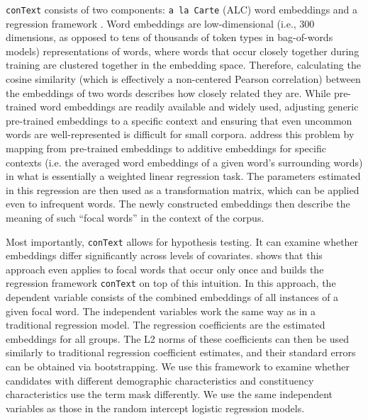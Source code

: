 \texttt{conText} consists of two components: \texttt{a la Carte} (ALC) word embeddings \parencite{khodak2018} and a regression framework \parencite{rodriguez2021embedding}. Word embeddings \parencite{mikolov2013} are low-dimensional (i.e., 300 dimensions, as opposed to tens of thousands of token types in bag-of-words models) representations of words, where words that occur closely together during training are clustered together in the embedding space. Therefore, calculating the cosine similarity (which is effectively a non-centered Pearson correlation) between the embeddings of two words describes how closely related they are. While pre-trained word embeddings are readily available and widely used, adjusting generic pre-trained embeddings to a specific context and ensuring that even uncommon words are well-represented is difficult for small corpora. \cite{khodak2018} address this problem by mapping from pre-trained embeddings to additive embeddings for specific contexts (i.e. the averaged word embeddings of a given word's surrounding words) in what is essentially a weighted linear regression task. The parameters estimated in this regression are then used as a transformation matrix, which can be applied even to infrequent words. The newly constructed embeddings then describe the meaning of such ``focal words'' in the context of the corpus.

Most importantly, \texttt{conText} allows for hypothesis testing. It can examine whether embeddings differ significantly across levels of covariates. \cite{rodriguez2021embedding} shows that this approach even applies to focal words that occur only once and builds the regression framework \texttt{conText} on top of this intuition. In this approach, the dependent variable consists of the combined embeddings of all instances of a given focal word. The independent variables work the same way as in a traditional regression model. The regression coefficients are the estimated embeddings for all groups. The L2 norms of these coefficients can then be used similarly to traditional regression coefficient estimates, and their standard errors can be obtained via bootstrapping. We use this framework to examine whether candidates with different demographic characteristics and constituency characteristics use the term mask differently. We use the same independent variables as those in the random intercept logistic regression models.

